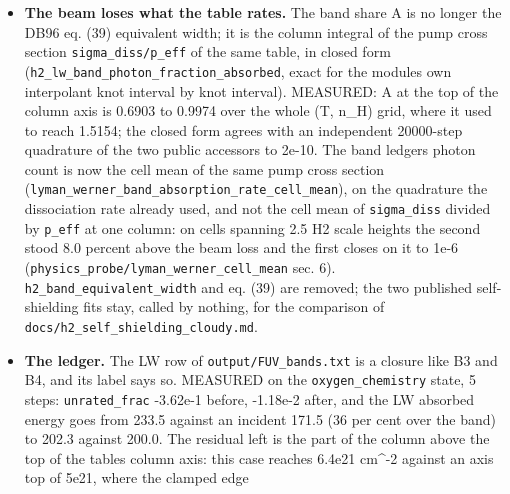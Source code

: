 \documentclass[english,a4paper]{my_memo}
\begin{document}
\begin{itemize}
\begin{itemize}
    records that it cancels out of \texttt{sigma\_pump} exactly. The nine
    \texttt{abs\_T\#\#\#\#.npz} were recomputed (\texttt{run\_abs.py}, 23 to 251 s each) and
    \texttt{h2\_self\_shielding\_table.f90} regenerated. MEASURED: the generator
    reproduced the shipped module byte for byte before the change, so the
    only difference is the band. \texttt{sigma\_pump} at the bottom of the column
    axis is 1.701e-17 (700 K) to 1.887e-17 cm\^{}2, which is DB96\textquotesingle s own
    2.557e-17 per 912-1110 A photon restated per 912-1201 A photon
    (1.676e-17) to 1-13 percent, the same agreement as before.
  \item
    \textbf{The beam loses what the table rates.} The band share A is no longer
    the DB96 eq. (39) equivalent width; it is the column integral of the
    pump cross section \texttt{sigma\_diss/p\_eff} of the same table, in closed form
    (\texttt{h2\_lw\_band\_photon\_fraction\_absorbed}, exact for the module\textquotesingle s own
    interpolant knot interval by knot interval). MEASURED: A at the top of
    the column axis is 0.6903 to 0.9974 over the whole (T, n\_H) grid, where
    it used to reach 1.5154; the closed form agrees with an independent
    20000-step quadrature of the two public accessors to 2e-10. The band
    ledger\textquotesingle s photon count is now the cell mean of the same pump cross
    section (\texttt{lyman\_werner\_band\_absorption\_rate\_cell\_mean}), on the
    quadrature the dissociation rate already used, and not the cell mean of
    \texttt{sigma\_diss} divided by \texttt{p\_eff} at one column: on cells spanning 2.5 H2
    scale heights the second stood 8.0 percent above the beam loss and the
    first closes on it to 1e-6 (\texttt{physics\_probe/lyman\_werner\_cell\_mean}
    sec. 6). \texttt{h2\_band\_equivalent\_width} and eq. (39) are removed; the two
    published self-shielding fits stay, called by nothing, for the
    comparison of \texttt{docs/h2\_self\_shielding\_cloudy.md}.
  \item
    \textbf{The ledger.} The LW row of \texttt{output/FUV\_bands.txt} is a closure like
    B3 and B4, and its label says so. MEASURED on the \texttt{oxygen\_chemistry}
    state, 5 steps: \texttt{unrated\_frac} -3.62e-1 before, -1.18e-2 after, and the
    LW absorbed energy goes from 233.5 against an incident 171.5 (36 per
    cent over the band) to 202.3 against 200.0. The residual left is the
    part of the column above the top of the table\textquotesingle s column axis: this case
    reaches 6.4e21 cm\^{}-2 against an axis top of 5e21, where the clamped edge

\end{itemize}
\end{itemize}
\end{document}
